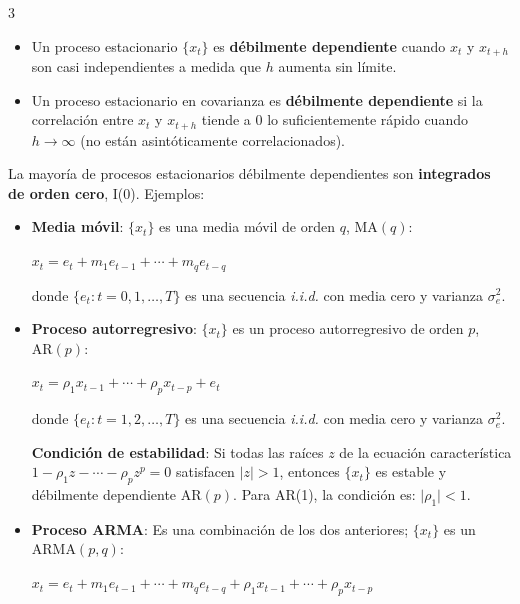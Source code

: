 \documentclass[10pt, a4paper, landscape]{article}
\begin{document}
\begin{multicols}{3}
\begin{itemize}[leftmargin=*]
	\item Un proceso estacionario \( \{ x_{t} \} \) es \textbf{débilmente dependiente} cuando \( x_{t} \) y \( x_{t + h} \) son casi independientes a medida que \( h \) aumenta sin límite.
	\item Un proceso estacionario en covarianza es \textbf{débilmente dependiente} si la correlación entre \( x_{t} \) y \( x_{t + h} \) tiende a 0 lo suficientemente rápido cuando \( h \rightarrow \infty \) (no están asintóticamente correlacionados).
\end{itemize}

La mayoría de procesos estacionarios débilmente dependientes son \textbf{integrados de orden cero}, I(0). Ejemplos:

\begin{itemize}[leftmargin=*]
	\item \textbf{Media móvil}: \( \{ x_{t} \} \) es una media móvil de orden \( q \), \( \text{MA}(q) \):
	\begin{center}
		\( x_{t} = e_{t} + m_{1} e_{t - 1} + \cdots + m_{q} e_{t - q} \)
	\end{center}
	donde \( \{ e_{t} : t = 0, 1, \ldots, T \} \) es una secuencia \textsl{i.i.d.} con media cero y varianza \( \sigma_{e}^{2} \).
	\item \textbf{Proceso autorregresivo}: \( \{ x_{t} \} \) es un proceso autorregresivo de orden \( p \), \( \text{AR}(p) \):
	\begin{center}
		\( x_{t} = \rho_{1} x_{t - 1} + \cdots + \rho_{p} x_{t - p} + e_{t} \)
	\end{center}
	donde \( \{ e_{t} : t = 1, 2, \ldots, T \} \) es una secuencia \textsl{i.i.d.} con media cero y varianza \( \sigma_{e}^{2} \).

	\textbf{Condición de estabilidad}: Si todas las raíces \( z \) de la ecuación característica \( 1 - \rho_{1} z - \cdots - \rho_{p} z^{p} = 0 \) satisfacen \( \lvert z \rvert > 1 \), entonces \( \{ x_{t} \} \) es estable y débilmente dependiente \( \text{AR}(p) \). Para AR(1), la condición es: \( \lvert \rho_{1} \rvert < 1 \).

	\item \textbf{Proceso ARMA}: Es una combinación de los dos anteriores; \( \{ x_{t} \} \) es un \( \text{ARMA}(p, q) \):
	\begin{center}
		\( x_{t} = e_{t} + m_{1} e_{t - 1} + \cdots + m_{q} e_{t - q} + \rho_{1} x_{t - 1} + \cdots + \rho_{p} x_{t - p} \)
	\end{center}
\end{itemize}


\end{multicols}
\end{document}
